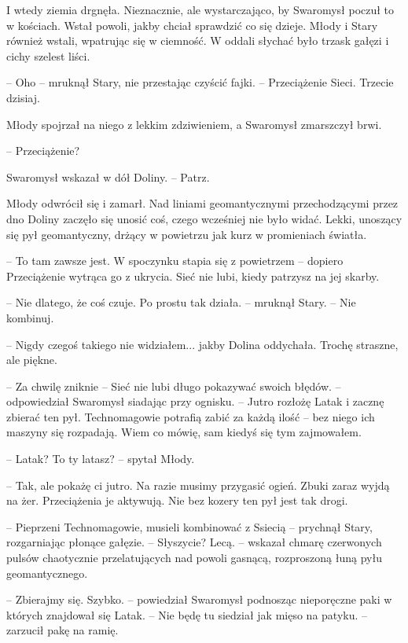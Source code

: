 \par\indent I wtedy ziemia drgnęła. Nieznacznie, ale wystarczająco, by Swaromysł poczuł to w kościach. Wstał powoli, jakby chciał sprawdzić co się dzieje. Młody i Stary również wstali, wpatrując się w ciemność. W oddali słychać było trzask gałęzi i cichy szelest liści.
\par\noindent-- Oho -- mruknął Stary, nie przestając czyścić fajki. -- Przeciążenie Sieci. Trzecie dzisiaj.
\par\indent Młody spojrzał na niego z lekkim zdziwieniem, a Swaromysł zmarszczył brwi.
\par\noindent-- Przeciążenie?
\par\indent Swaromysł wskazał w dół Doliny. -- Patrz.
\par\indent Młody odwrócił się i zamarł. Nad liniami geomantycznymi przechodzącymi przez dno Doliny zaczęło się unosić coś, czego wcześniej nie było widać. Lekki, unoszący się pył geomantyczny, drżący w powietrzu jak kurz w promieniach światła.
\par\indent-- To tam zawsze jest. W spoczynku stapia się z powietrzem -- dopiero Przeciążenie wytrąca go z ukrycia. Sieć nie lubi, kiedy patrzysz na jej skarby. 
\par\indent-- Nie dlatego, że coś czuje. Po prostu tak działa. -- mruknął Stary. -- Nie kombinuj.
\par\indent-- Nigdy czegoś takiego nie widziałem... jakby Dolina oddychała. Trochę straszne, ale piękne.
\par\indent-- Za chwilę zniknie -- Sieć nie lubi długo pokazywać swoich błędów. -- odpowiedział Swaromysł siadając przy ognisku. -- Jutro rozłożę Latak i zacznę zbierać ten pył. Technomagowie potrafią zabić za każdą ilość -- bez niego ich maszyny się rozpadają. Wiem co mówię, sam kiedyś się tym zajmowałem.
\par\indent-- Latak? To ty latasz? -- spytał Młody.
\par\indent-- Tak, ale pokażę ci jutro. Na razie musimy przygasić ogień. Zbuki zaraz wyjdą na żer. Przeciążenia je aktywują. Nie bez kozery ten pył jest tak drogi.
\par\indent-- Pieprzeni Technomagowie, musieli kombinować z Ssiecią -- prychnął Stary, rozgarniając płonące gałęzie. -- Słyszycie? Lecą. -- wskazał chmarę czerwonych pulsów chaotycznie przelatujących nad powoli gasnącą, rozproszoną łuną pyłu geomantycznego.
\par\indent-- Zbierajmy się. Szybko. -- powiedział Swaromysł podnosząc nieporęczne paki w których znajdował się Latak. -- Nie będę tu siedział jak mięso na patyku. -- zarzucił pakę na ramię.
